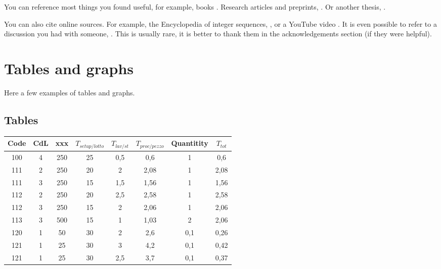 You can reference most things you found useful,
for example, books \cite{Biggs2002,Knuth1998ArtOfProgramming,LascouxPolynomialsBook}.
Research articles and preprints, \cite{AlexanderssonSulzgruber2019,Sherman2015x}.
Or another thesis, \cite{Teff2013}.

You can also cite online sources. For example, the Encyclopedia of integer sequences, \cite{OEIS},
or a YouTube video \cite{Bazett2018yt}. 
It is even possible to refer to a discussion you had with someone, \cite{PrivateCommunicationWithJustin}.
This is usually rare, it is better to thank them in the acknowledgements section (if they were helpful).



\clearpage{\thispagestyle{empty}\cleardoublepage}
\section{Tables and graphs}
Here a few examples of tables and graphs.
\subsection{Tables}
\begin{center}
	\begin{tabular}{c c c c c c c c}
		\arrayrulecolor{Azzurro}
		\hline
		{\bfseries Code} & {\bfseries CdL} & {\bfseries xxx} & {\bfseries $T_{setup/lotto}$} & {\bfseries $T_{lav/st}$} & {\bfseries $T_{proc/pezzo}$} & {\bfseries Quantitity} & {\bfseries $T_{tot}$}\\
		\hline
		100 & 4 & 250 & 25 & 0,5 & 0,6 & 1 & 0,6\\
		111 & 2 & 250 & 20 & 2 & 2,08 & 1 & 2,08 \\
		111 & 3 & 250 & 15 & 1,5 & 1,56 & 1 & 1,56 \\
		112 & 2 & 250 & 20 & 2,5 & 2,58 & 1 & 2,58 \\
		112 & 3 & 250 & 15 & 2 & 2,06 & 1 & 2,06\\
		113 & 3 & 500 & 15 & 1 & 1,03 & 2 & 2,06\\
		120 & 1 & 50 & 30 & 2 & 2,6 & 0,1 & 0,26\\
		121 & 1 & 25 & 30 & 3 & 4,2 & 0,1 & 0,42 \\
		121 & 1 & 25 & 30 & 2,5 & 3,7 & 0,1 & 0,37 \\
		\hline
	\end{tabular}
\end{center}



